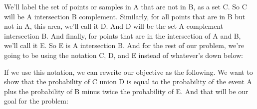 \documentclass[pdftex, brazil, 12pt, twoside]{article}
\begin{document}
We'll label the set of points or samples
in A that are not in B, as a set C.
So C will be A intersection B complement.
Similarly, for all points that are
in B but not in A, this area, we'll call it D.
And D will be the set A complement intersection
B. And finally, for points that are in the intersection of A
and B, we'll call it E. So E is A intersection B.
And for the rest of our problem, we're
going to be using the notation C, D, and E
instead of whatever's down below:

\begin{figure}[H]
  \begin{center}
  \end{center}
\end{figure}

If we use this notation, we can rewrite our objective
as the following.
We want to show that the probability of C union D
is equal to the probability of the event
A plus the probability of B minus twice
the probability of E. And that will
be our goal for the problem:

\begin{figure}[H]
  \begin{center}
  \end{center}
\end{figure}
\end{document}
